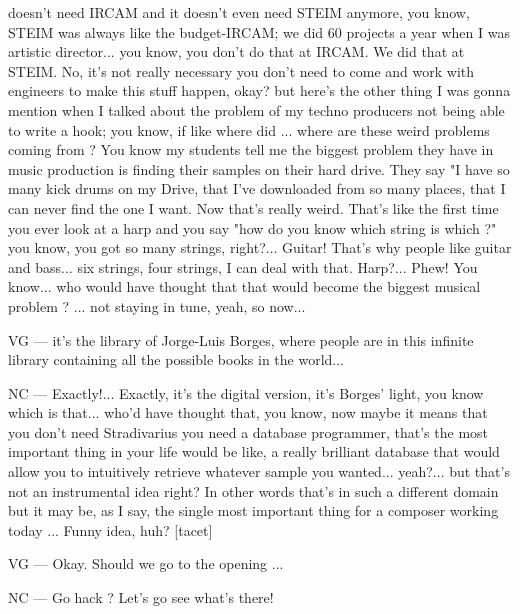 doesn't need IRCAM and it doesn't even need STEIM anymore, you know, STEIM was always like the budget-IRCAM; we did 60 projects a year when I was artistic director... you know, you don't do that at IRCAM. We did that at STEIM. No, it's not really necessary you don't need to come and work with engineers to make this stuff happen, okay? but here's the other thing I was gonna mention when I talked about the problem of my techno producers not being able to write a hook; you know, if like where did ... where are these weird problems coming from ? You know my students tell me the biggest problem they have in music production is finding their samples on their hard drive. They say "I have so many kick drums on my Drive, that I've downloaded from so many places, that I can never find the one I want. Now that's really weird. That's like the first time you ever look at a harp and you say "how do you know which string is which ?" you know, you got so many strings, right?... Guitar! That's why people like guitar and bass... six strings, four strings, I can deal with that. Harp?... Phew! You know... who would have thought that that would become the biggest musical problem ? ... not staying in tune, yeah, so now... 

VG — it's the library of Jorge-Luis Borges,  where people are in this infinite library containing all the possible  books in the world... 

NC — Exactly!... Exactly, it's the digital version, it's Borges' light, you know which is that... who'd have thought that, you know,  now maybe it means that you don't need Stradivarius you need a database programmer, that's the most important thing in your life would be like, a really brilliant database that would allow you to intuitively retrieve whatever sample you wanted... yeah?... but that's not an instrumental  idea right? In other words that's in such a different domain but it may be, as I say, the single most important thing for a composer working today ... Funny idea, huh? [tacet] 

VG — Okay. Should we go to the opening ... 

NC — Go hack ? Let's go see what's there! 
